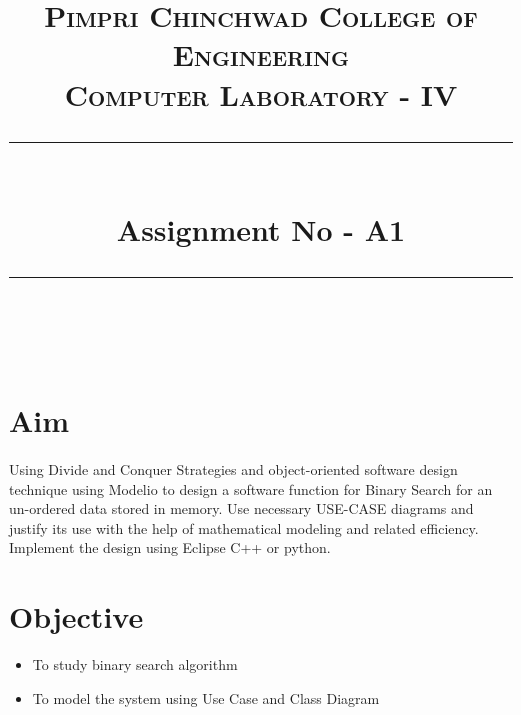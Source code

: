 \documentclass[a4paper,12pt]{article}
\title{
	\normalfont \normalsize 
	\textsc{Pimpri Chinchwad College of Engineering \\ 
		Computer Laboratory - IV} \\
	[10pt]   
	\rule{\linewidth}{0.5pt} \\[6pt] 
	\huge Assignment No - A1 \\
	\rule{\linewidth}{2pt}  \\[10pt]
}
\author{}
\date{\normalsize}
\begin{document}
\maketitle

\section{Aim}
	\paragraph{} Using Divide and Conquer Strategies and object-oriented software design technique using Modelio to
	design a software function for Binary Search for an un-ordered data stored in memory. Use necessary
	USE-CASE diagrams and justify its use with the help of mathematical modeling and related efficiency.
	Implement the design using Eclipse C++ or python.
	
\section{Objective}
	\begin{itemize}
		\item To study binary search algorithm
		\item To model the system using Use Case and Class Diagram
	\end{itemize}
	
\end{document}
